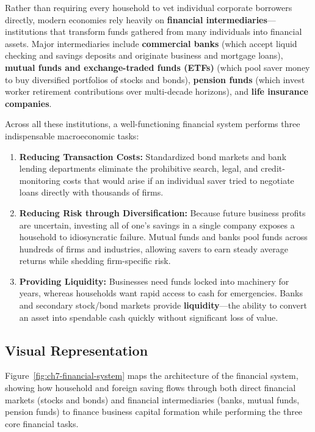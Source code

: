 \documentclass[11pt,letterpaper]{article}
\begin{document}
Rather than requiring every household to vet individual corporate borrowers directly, modern economies rely heavily on \textbf{financial intermediaries}—institutions that transform funds gathered from many individuals into financial assets. Major intermediaries include \textbf{commercial banks} (which accept liquid checking and savings deposits and originate business and mortgage loans), \textbf{mutual funds and exchange-traded funds (ETFs)} (which pool saver money to buy diversified portfolios of stocks and bonds), \textbf{pension funds} (which invest worker retirement contributions over multi-decade horizons), and \textbf{life insurance companies}.

Across all these institutions, a well-functioning financial system performs three indispensable macroeconomic tasks:
\begin{enumerate}[noitemsep]
  \item \textbf{Reducing Transaction Costs:} Standardized bond markets and bank lending departments eliminate the prohibitive search, legal, and credit-monitoring costs that would arise if an individual saver tried to negotiate loans directly with thousands of firms.
  \item \textbf{Reducing Risk through Diversification:} Because future business profits are uncertain, investing all of one's savings in a single company exposes a household to idiosyncratic failure. Mutual funds and banks pool funds across hundreds of firms and industries, allowing savers to earn steady average returns while shedding firm-specific risk.
  \item \textbf{Providing Liquidity:} Businesses need funds locked into machinery for years, whereas households want rapid access to cash for emergencies. Banks and secondary stock/bond markets provide \textbf{liquidity}—the ability to convert an asset into spendable cash quickly without significant loss of value.
\end{enumerate}

\subsection*{Visual Representation}
Figure~\ref{fig:ch7-financial-system} maps the architecture of the financial system, showing how household and foreign saving flows through both direct financial markets (stocks and bonds) and financial intermediaries (banks, mutual funds, pension funds) to finance business capital formation while performing the three core financial tasks.
\end{document}
